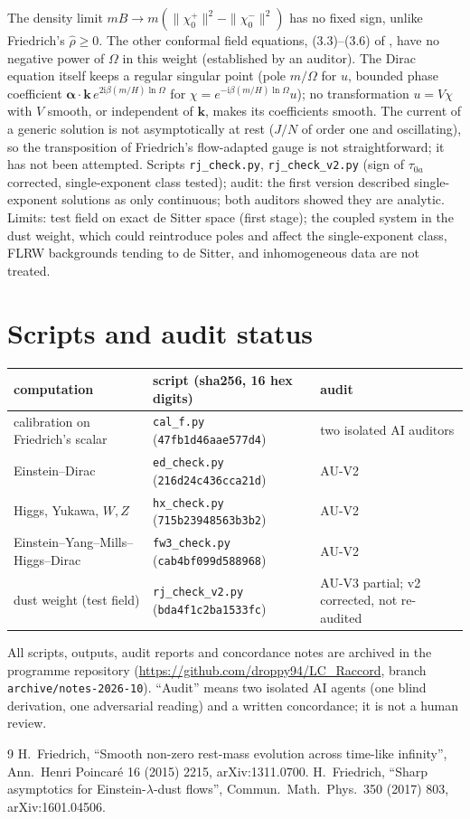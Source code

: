 \documentclass[11pt,a4paper]{article}
\newcommand{\ii}{\mathrm{i}}
\begin{document}
The density limit $mB\to m(\|\chi_{0}^{+}\|^{2}-\|\chi_{0}^{-}\|^{2})$ has no fixed sign, unlike Friedrich's $\hat\rho\ge0$. The other conformal field equations, (3.3)--(3.6) of \cite{Friedrich2017}, have no negative power of $\Omega$ in this weight (established by an auditor). The Dirac equation itself keeps a regular singular point (pole $m/\Omega$ for $u$, bounded phase coefficient $\boldsymbol\alpha\cdot\mathbf{k}\,e^{2\ii\beta(m/H)\ln\Omega}$ for $\chi=e^{-\ii\beta(m/H)\ln\Omega}u$); no transformation $u=V\chi$ with $V$ smooth, or independent of $\mathbf{k}$, makes its coefficients smooth. The current of a generic solution is not asymptotically at rest ($J/N$ of order one and oscillating), so the transposition of Friedrich's flow-adapted gauge is not straightforward; it has not been attempted. Scripts \texttt{rj\_check.py}, \texttt{rj\_check\_v2.py} (sign of $\tau_{0a}$ corrected, single-exponent class tested); audit: the first version described single-exponent solutions as only continuous; both auditors showed they are analytic. Limits: test field on exact de Sitter space (first stage); the coupled system in the dust weight, which could reintroduce poles and affect the single-exponent class, FLRW backgrounds tending to de Sitter, and inhomogeneous data are not treated.

\section{Scripts and audit status}
\begin{center}\small
\begin{tabular}{lll}
\toprule
computation & script (sha256, 16 hex digits) & audit\\
\midrule
calibration on Friedrich's scalar & \texttt{cal\_f.py} (\texttt{47fb1d46aae577d4}) & two isolated AI auditors\\
Einstein--Dirac & \texttt{ed\_check.py} (\texttt{216d24c436cca21d}) & AU-V2\\
Higgs, Yukawa, $W,Z$ & \texttt{hx\_check.py} (\texttt{715b23948563b3b2}) & AU-V2\\
Einstein--Yang--Mills--Higgs--Dirac & \texttt{fw3\_check.py} (\texttt{cab4bf099d588968}) & AU-V2\\
dust weight (test field) & \texttt{rj\_check\_v2.py} (\texttt{bda4f1c2ba1533fc}) & AU-V3 partial; v2 corrected, not re-audited\\
\bottomrule
\end{tabular}
\end{center}
All scripts, outputs, audit reports and concordance notes are archived in the programme repository (\url{https://github.com/droppy94/LC_Raccord}, branch \texttt{archive/notes-2026-10}). ``Audit'' means two isolated AI agents (one blind derivation, one adversarial reading) and a written concordance; it is not a human review.

\begin{thebibliography}{9}
 H.~Friedrich, ``Smooth non-zero rest-mass evolution across time-like infinity'', Ann.\ Henri Poincar\'e 16 (2015) 2215, arXiv:1311.0700.
 H.~Friedrich, ``Sharp asymptotics for Einstein-$\lambda$-dust flows'', Commun.\ Math.\ Phys.\ 350 (2017) 803, arXiv:1601.04506.
\end{thebibliography}
\end{document}
